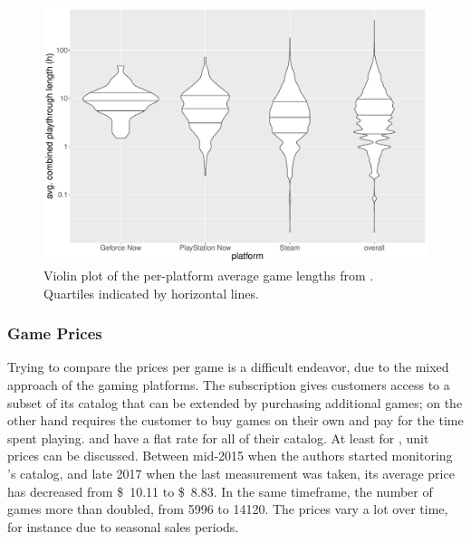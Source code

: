 \begin{figure}[!t]
	\centering
	\includegraphics[width=1.0\columnwidth]{images/gamelengths-by-platform-violin.pdf}
	\caption{Violin plot of the per-platform average game lengths from \hltb. Quartiles indicated by horizontal lines.}
\label{fig:gamelengths-violin}
\end{figure}


\subsubsection{Game Prices}

Trying to compare the prices per game is a difficult endeavor, due to
the mixed approach of the gaming platforms. The \gfnow subscription
gives customers access to a subset of its catalog that can be
extended by purchasing additional games; \gfnowpc 
on the other hand requires the customer to buy games on their
own and pay for the time spent playing.
\psnow and \psnowpc have a flat rate for all of their catalog.
At least for \steam, unit prices can be discussed.
Between mid-2015 when the authors started monitoring \steam's catalog,
and late 2017 when the last measurement was taken,
its average price has decreased from \SI{10.11}[\$]{} to \SI{8.83}[\$]{}. In the same
timeframe, the number of games more than doubled, from \num{5996} to
\num{14120}. The prices vary a lot over time, for instance due to
seasonal sales periods.

